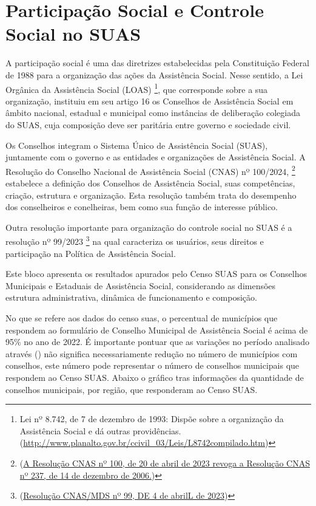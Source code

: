 \documentclass[
  brazilian]{report}
\begin{document}
\hypertarget{participauxe7uxe3o-social-e-controle-social-no-suas}{%
\chapter{Participação Social e Controle Social no
SUAS}\label{participauxe7uxe3o-social-e-controle-social-no-suas}}

A participação social é uma das diretrizes estabelecidas pela
Constituição Federal de 1988 para a organização das ações da Assistência
Social. Nesse sentido, a Lei Orgânica da Assistência Social (LOAS)
\footnote{Lei nº 8.742, de 7 de dezembro de 1993: Dispõe sobre a organização da Assistência Social e dá outras providências. (\url{http://www.planalto.gov.br/ccivil_03/Leis/L8742compilado.htm})},
que corresponde sobre a sua organização, instituiu em seu artigo 16 os
Conselhos de Assistência Social em âmbito nacional, estadual e municipal
como instâncias de deliberação colegiada do SUAS, cuja composição deve
ser paritária entre governo e sociedade civil.

Os Conselhos integram o Sistema Único de Assistência Social (SUAS),
juntamente com o governo e as entidades e organizações de Assistência
Social. A Resolução do Conselho Nacional de Assistência Social (CNAS) nº
100/2024,
\footnote{(\url{A Resolução CNAS nº 100, de 20 de abril de 2023 revoga a Resolução CNAS nº 237, de 14 de dezembro de 2006.})}
estabelece a definição dos Conselhos de Assistência Social, suas
competências, criação, estrutura e organização. Esta resolução também
trata do desempenho dos conselheiros e conelheiras, bem como sua função
de interesse público.

Outra resolução importante para organização do controle social no SUAS é
a resolução nº 99/2023
\footnote{(\url{Resolução CNAS/MDS nº 99, DE 4 de abrilL de 2023})} na
qual caracteriza os usuários, seus direitos e participação na Política
de Assistência Social.

Este bloco apresenta os resultados apurados pelo Censo SUAS para os
Conselhos Municipais e Estaduais de Assistência Social, considerando as
dimensões estrutura administrativa, dinâmica de funcionamento e
composição.

No que se refere aos dados do censo suas, o percentual de municípios que
respondem ao formulário de Conselho Municipal de Assistência Social é
acima de 95\% no ano de 2022. É importante pontuar que as variações no
período analisado através () não significa
necessariamente redução no número de municípios com conselhos, este
número pode representar o número de conselhos municipais que respondem
ao Censo SUAS. Abaixo o gráfico tras informações da quantidade de
conselhos municipais, por região, que responderam ao Censo SUAS.
\end{document}
